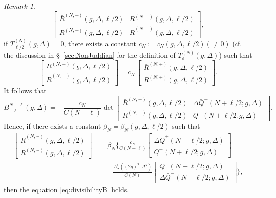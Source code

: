\documentclass[11pt]{article}
\numberwithin{equation}{section}
\newcommand{\e}{\varepsilon}
\theoremstyle{plain}
\theoremstyle{definition}
\theoremstyle{remark}
\newtheorem{rem}{Remark}[section]
\begin{document}
\begin{rem}
\begin{equation}
    \begin{bmatrix}
      \bar{R}^{(N,+)}(g,\Delta,\ell/2) & R^{(N,-)}(g,\Delta, \ell/2)  \\
      R^{(N,+)}(g,\Delta, \ell/2) & \bar{R}^{(N,-)}(g,\Delta,\ell/2)
    \end{bmatrix},
  \end{equation}
  if $T^{(N)}_{\ell/2}(g,\Delta)=0$, there exists a constant $c_N:=c_N(g,\Delta,\ell/2)(\not=0)$ (cf. the
  discussion in \S~\ref{sec:NonJuddian} for the definition of $T^{(N)}_{\e}(g,\Delta)$) such that
  \begin{equation}
    \begin{bmatrix}
      R^{(N,-)}(g,\Delta, \ell/2)  \\
      \bar{R}^{(N,-)}(g,\Delta,\ell/2)
    \end{bmatrix}
    =   c_N\,
    \begin{bmatrix}
      \bar{R}^{(N,+)}(g,\Delta,\ell/2)\\
      R^{(N,+)}(g,\Delta, \ell/2)
    \end{bmatrix}.
  \end{equation}
  It follows that
  \begin{equation}
    B^{N+\ell}_{-\ell}(g,\Delta) = -\frac{c_N}{C(N+\ell)}\det
    \begin{bmatrix}
      \bar{R}^{(N,+)}(g,\Delta,\ell/2) &  \Delta \bar{Q}^+(N+\ell/2;g,\Delta) \\
      R^{(N,+)}(g,\Delta, \ell/2) & Q^+(N+\ell/2;g,\Delta)
    \end{bmatrix}.
  \end{equation}
  Hence, if there exists a constant $\beta_N=\beta_N(g,\Delta, \ell/2)$ such that
  \begin{align*}
     \begin{bmatrix}
      \bar{R}^{(N,+)}(g,\Delta,\ell/2)\\
      R^{(N,+)}(g,\Delta, \ell/2)
    \end{bmatrix}
    = &\beta_N
        \Big\{
        \frac{c_N}{C(N+\ell)}
        \begin{bmatrix}
          \Delta \bar{Q}^+(N+\ell/2;g,\Delta) \\
          Q^+(N+\ell/2;g,\Delta)
        \end{bmatrix} \\
    &+ \frac{A_N^{\ell}((2g)^2,\Delta^2)}{C(N)}
    \begin{bmatrix}
      Q^-(N+\ell/2;g,\Delta) \\
      \Delta \bar{Q}^-(N+\ell/2;g,\Delta)
    \end{bmatrix}
    \Big\} ,
  \end{align*}
  then the equation \eqref{eq:divisibilityB} holds.
\end{rem}
\end{document}

